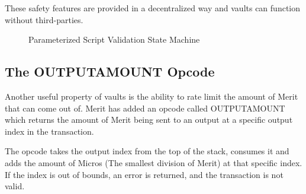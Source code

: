 \documentclass{article}
\begin{document}
These safety features are provided in a decentralized way and vaults can function
without third-parties.

\begin{figure}[H]
    \begin{center}
    \end{center}
    \caption{Parameterized Script Validation State Machine}
\end{figure}

\subsection{The OUTPUTAMOUNT Opcode}

\begin{center}
\end{center}

Another useful property of vaults is the ability to rate limit the amount of Merit
that can come out of. Merit has added an opcode called OUTPUTAMOUNT which
returns the amount of Merit being sent to an output at a specific output index in
the transaction.

The opcode takes the output index from the top of the stack, consumes it and adds the
amount of Micros (The smallest division of Merit) at that specific index. If the index
is out of bounds, an error is returned, and the transaction is not valid.
\end{document}

